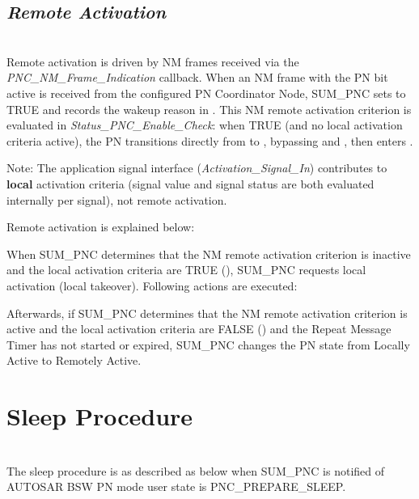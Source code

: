 

\subsection{\textit{Remote Activation}}
\\
Remote activation is driven by NM frames received via the \textit{PNC\_NM\_Frame\_Indication} callback. When an NM frame with the PN bit active is received from the configured PN Coordinator Node, SUM\_PNC sets  to TRUE and records the wakeup reason in . This NM remote activation criterion is evaluated in \textit{Status\_PNC\_Enable\_Check}: when TRUE (and no local activation criteria active), the PN transitions directly from  to , bypassing  and , then enters .

Note: The application signal interface (\textit{Activation\_Signal\_In}) contributes to \textbf{local} activation criteria (signal value and signal status are both evaluated internally per signal), not remote activation.

Remote activation is explained below:


When SUM\_PNC determines that the NM remote activation criterion is inactive and the local activation criteria are TRUE (), SUM\_PNC requests local activation (local takeover). Following actions are executed:


Afterwards, if SUM\_PNC determines that the NM remote activation criterion is active and the local activation criteria are FALSE () and the Repeat Message Timer has not started or expired, SUM\_PNC changes the PN state from Locally Active to Remotely Active.

  
 

\section{Sleep Procedure}
\\
The sleep procedure is as described as below when SUM_PNC is notified of AUTOSAR BSW PN mode user state is PNC_PREPARE_SLEEP.

